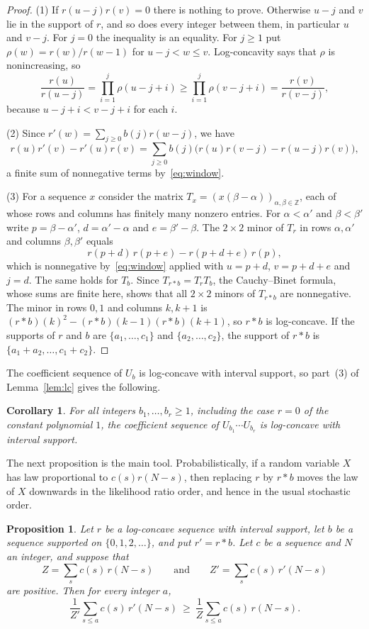 \documentclass{amsart}
\newtheorem{proposition}[theorem]{Proposition}
\newtheorem{corollary}[theorem]{Corollary}
\theoremstyle{definition}
\theoremstyle{remark}
\numberwithin{equation}{section}
\newcommand{\Z}{\mathbb{Z}}
\begin{document}
\begin{proof}
(1) If $r(u-j)r(v)=0$ there is nothing to prove. Otherwise $u-j$ and $v$ lie in the support of $r$, and so does every integer between them, in particular $u$ and $v-j$. For $j=0$ the inequality is an equality. For $j\ge1$ put $\rho(w)=r(w)/r(w-1)$ for $u-j<w\le v$. Log-concavity says that $\rho$ is nonincreasing, so
\[
\frac{r(u)}{r(u-j)}=\prod_{i=1}^{j}\rho(u-j+i)\ge\prod_{i=1}^{j}\rho(v-j+i)=\frac{r(v)}{r(v-j)},
\]
because $u-j+i<v-j+i$ for each $i$.

(2) Since $r'(w)=\sum_{j\ge0}b(j)r(w-j)$, we have
\[
r(u)r'(v)-r'(u)r(v)=\sum_{j\ge0}b(j)\bigl(r(u)r(v-j)-r(u-j)r(v)\bigr),
\]
a finite sum of nonnegative terms by~\eqref{eq:window}.

(3) For a sequence $x$ consider the matrix $T_x=(x(\beta-\alpha))_{\alpha,\beta\in\Z}$, each of whose rows and columns has finitely many nonzero entries. For $\alpha<\alpha'$ and $\beta<\beta'$ write $p=\beta-\alpha'$, $d=\alpha'-\alpha$ and $e=\beta'-\beta$. The $2\times2$ minor of $T_r$ in rows $\alpha,\alpha'$ and columns $\beta,\beta'$ equals
\[
r(p+d)\,r(p+e)-r(p+d+e)\,r(p),
\]
which is nonnegative by~\eqref{eq:window} applied with $u=p+d$, $v=p+d+e$ and $j=d$. The same holds for $T_b$. Since $T_{r*b}=T_rT_b$, the Cauchy--Binet formula, whose sums are finite here, shows that all $2\times2$ minors of $T_{r*b}$ are nonnegative. The minor in rows $0,1$ and columns $k,k+1$ is $(r*b)(k)^2-(r*b)(k-1)(r*b)(k+1)$, so $r*b$ is log-concave. If the supports of $r$ and $b$ are $\{a_1,\dots,c_1\}$ and $\{a_2,\dots,c_2\}$, the support of $r*b$ is $\{a_1+a_2,\dots,c_1+c_2\}$.
\end{proof}

The coefficient sequence of $U_b$ is log-concave with interval support, so part~(3) of Lemma~\ref{lem:lc} gives the following.

\begin{corollary}\label{cor:products}
For all integers $b_1,\dots,b_r\ge1$, including the case $r=0$ of the constant polynomial $1$, the coefficient sequence of $U_{b_1}\cdots U_{b_r}$ is log-concave with interval support.
\end{corollary}

The next proposition is the main tool. Probabilistically, if a random variable $X$ has law proportional to $c(s)r(N-s)$, then replacing $r$ by $r*b$ moves the law of $X$ downwards in the likelihood ratio order, and hence in the usual stochastic order.

\begin{proposition}\label{prop:extra}
Let $r$ be a log-concave sequence with interval support, let $b$ be a sequence supported on $\{0,1,2,\dots\}$, and put $r'=r*b$. Let $c$ be a sequence and $N$ an integer, and suppose that
\[
Z=\sum_{s}c(s)\,r(N-s)\qquad\text{and}\qquad Z'=\sum_{s}c(s)\,r'(N-s)
\]
are positive. Then for every integer $a$,
\begin{equation}\label{eq:extra}
\frac1{Z'}\sum_{s\le a}c(s)\,r'(N-s)\ \ge\ \frac1Z\sum_{s\le a}c(s)\,r(N-s).
\end{equation}
\end{proposition}
\end{document}
